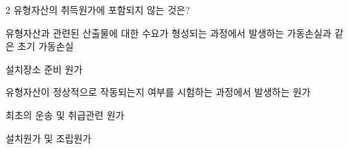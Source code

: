 \begin{question}{2}
유형자산의 취득원가에 포함되지 않는 것은?
\begin{choices}
  \item 유형자산과 관련된 산출물에 대한 수요가 형성되는 과정에서 발생하는 가동손실과 같은 초기 가동손실
  \item 설치장소 준비 원가
  \item 유형자산이 정상적으로 작동되는지 여부를 시험하는 과정에서 발생하는 원가
  \item 최초의 운송 및 취급관련 원가
  \item 설치원가 및 조립원가
\end{choices}
\end{question}
